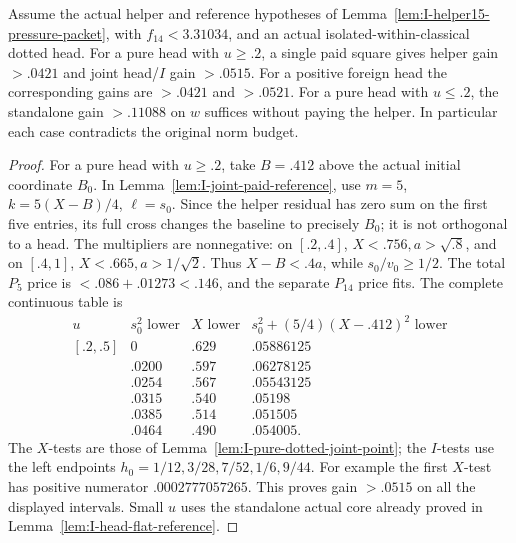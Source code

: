 \begin{lemma}
\label{lem:I-helper15-head-coupling}
Assume the actual helper and reference hypotheses of
Lemma~\ref{lem:I-helper15-pressure-packet}, with \(f_{14}<3.31034\),
and an actual isolated-within-classical dotted head. For a pure head
with \(u\ge.2\), a single paid square gives helper gain \(>.0421\)
and joint head/\(I\) gain \(>.0515\). For a positive foreign head
the corresponding gains are \(>.0421\) and \(>.0521\).
For a pure head with \(u\le.2\), the standalone gain \(>.11088\)
on \(w\) suffices without paying the helper.
In particular each case contradicts the original norm budget.
\end{lemma}
\begin{proof}
For a pure head with \(u\ge.2\), take \(B=.412\) above the actual
initial coordinate \(B_0\). In
Lemma~\ref{lem:I-joint-paid-reference}, use \(m=5\),
\(k=5(X-B)/4\), \(\ell=s_0\). Since the helper residual has
zero sum on the first five entries, its full cross changes the
baseline to precisely \(B_0\); it is not orthogonal to a head.
The multipliers are nonnegative: on \([.2,.4]\),
\(X<.756,a>\sqrt{.8}\), and on \([.4,1]\),
\(X<.665,a>1/\sqrt2\). Thus \(X-B<.4a\), while
\(s_0/v_0\ge1/2\). The total \(P_5\) price is
\(<.086+.01273<.146\), and the separate \(P_{14}\) price fits.
The complete continuous table is
\[
\begin{array}{c|c|c|c}
u&s_0^2\text{ lower}&X\text{ lower}&
 s_0^2+(5/4)(X-.412)^2\text{ lower}\\ \hline
[.2,.5]&0&.629&.05886125\\
[.5,.6]&.0200&.597&.06278125\\
[.6,.7]&.0254&.567&.05543125\\
[.7,.8]&.0315&.540&.05198\\
[.8,.9]&.0385&.514&.051505\\
[.9,1]&.0464&.490&.054005 .
\end{array}
\]
The \(X\)-tests are those of
Lemma~\ref{lem:I-pure-dotted-joint-point}; the \(I\)-tests use
the left endpoints \(h_0=1/12,3/28,7/52,1/6,9/44\).
For example the first \(X\)-test has positive numerator
\(.0002777057265\). This proves gain \(>.0515\) on all the
displayed intervals. Small \(u\) uses the standalone actual core
already proved in Lemma~\ref{lem:I-head-flat-reference}.


\end{proof}
